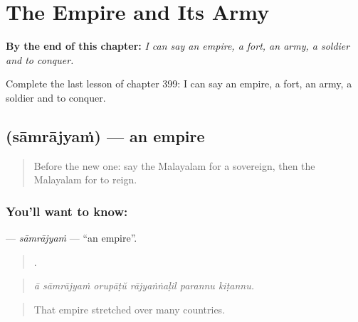 
\chapter{The Empire and Its Army}
\label{ch:ml-the-empire-and-its-army}

\begin{chapteropening}
\textbf{By the end of this chapter:} \emph{I can say an empire, a fort, an army, a soldier and to conquer.}

Complete the last lesson of chapter 399: I can say an empire, a fort, an army, a soldier and to conquer.
\end{chapteropening}

\section[\texorpdfstring{\ml{സാമ്രാജ്യം} (sāmrājyaṁ)}{സാമ്രാജ്യം (sāmrājyaṁ)}]{ (sāmrājyaṁ) — an empire}

\label{lesson:ML-C399-samrajyam}



\begin{quote}
Before the new one: say the Malayalam for a sovereign, then the Malayalam for to reign.
\end{quote}

\subsection*{You'll want to know: }
\textbf{} — \emph{sāmrājyaṁ} — \textquotedblleft{}an empire\textquotedblright{}.

\begin{quote}
     .
\end{quote}

\begin{quote}
\emph{ā sāmrājyaṁ orupāṭŭ rājyaṅṅaḷil parannu kiṭannu.}
\end{quote}

\begin{quote}
That empire stretched over many countries.
\end{quote}


